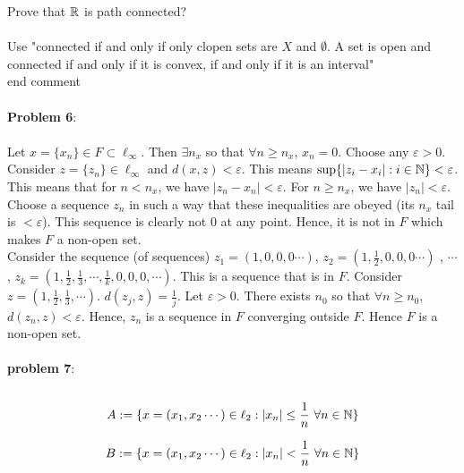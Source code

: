 \documentclass[../Main.tex]{subfiles}
\begin{document}
Prove that $\mathbb R$ is path connected? 
\\\\ Use "connected if and only if only clopen sets are $X$ and $\emptyset$. A set is open and connected if and only if it is convex, if and only if it is an interval"
\\ end comment
\\\\ \textbf{Problem 6}:
\\\\ Let $x=\{x_n\} \in F \subset \ell_{\infty}$. Then $\exists n_x$ so that $\forall n \geq n_x$, $x_n=0$. Choose any $\varepsilon>0$. Consider $z=\{z_n\} \in \ell_{\infty}$ and $d(x,z)<\varepsilon$. This means $\sup\{|z_i-x_i|: i \in \mathbb N\}<\varepsilon$. This means that for $n< n_x$, we have $|z_n-x_n|<\varepsilon$. For $n \geq n_x$, we have $|z_n|< \varepsilon$. Choose a sequence $z_n$ in such a way that these inequalities are obeyed (its $n_x$ tail is $<\varepsilon$). This sequence is clearly not $0$ at any point. Hence, it is not in $F$ which makes $F$ a non-open set.
\\ Consider the sequence (of sequences) $z_1=(1,0,0,0 \cdots)$, $z_2=(1,\frac{1}{2},0,0,0 \cdots)$ , $\cdots$, $z_k=(1,\frac{1}{2},\frac{1}{3},\cdots,\frac{1}{k},0,0,0, \cdots)$. This is a sequence that is in $F$. Consider $z=(1,\frac{1}{2},\frac{1}{3}, \cdots)$. $d(z_j,z)=\frac{1}{j}$. Let $\varepsilon>0$. There exists $n_0$ so that $\forall n \geq n_0$, $d(z_n,z)<\varepsilon$. Hence, $z_n$ is a sequence in $F$ converging outside $F$. Hence $F$ is a non-open set.
\\\\ \textbf{problem 7}:
\\\\ $$A:=\{x=(x_1,x_2 \cdots) \in \ell_2: |x_n| \leq \frac{1}{n} \ \forall n \in \mathbb N \}$$

$$B:=\{x=(x_1,x_2 \cdots) \in \ell_2: |x_n| < \frac{1}{n} \ \forall n \in \mathbb N \}$$
\end{document}
